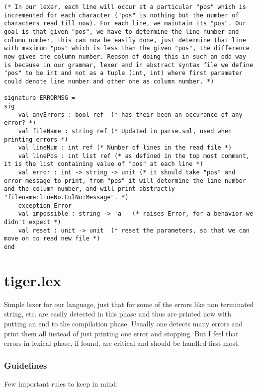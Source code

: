 \begin{verbatim}
(* In our lexer, each line will occur at a particular "pos" which is incremented for each character ("pos" is nothing but the number of characters read till now). For each line, we maintain its "pos". Our goal is that given "pos", we have to determine the line number and column number, this can now be easily done, just determine that line with maximum "pos" which is less than the given "pos", the difference now gives the column number. Reason of doing this in such an odd way is because in our grammar, lexer and in abstract syntax file we define "pos" to be int and not as a tuple (int, int) where first parameter could denote line number and other one as column number. *)

signature ERRORMSG =
sig
    val anyErrors : bool ref  (* has their been an occurance of any error? *)
    val fileName : string ref (* Updated in parse.sml, used when printing errors *)
    val lineNum : int ref (* Number of lines in the read file *)
    val linePos : int list ref (* as defined in the top most comment, it is the list containing value of "pos" at each line *)
    val error : int -> string -> unit (* it should take "pos" and error message to print, from "pos" it will determine the line number and the column number, and will print abstractly "filename:lineNo.ColNo:Message". *)
    exception Error
    val impossible : string -> 'a   (* raises Error, for a behavior we didn't expect *)
    val reset : unit -> unit  (* reset the parameters, so that we can move on to read new file *)
end
\end{verbatim}

\section{tiger.lex}

Simple lexer for our language, just that for some of the errors like non terminated string, etc. are easily detected in this phase and thus are printed now with putting an end to the compilation phase. Usually one detects many errors and print them all instead of just printing one error and stopping. But I feel that errors in lexical phase, if found, are critical and should be handled first most. 

\subsubsection{Guidelines}

Few important rules to keep in mind:

